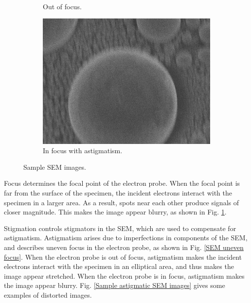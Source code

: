 \documentclass[conference]{IEEEtran}
\begin{document}
\begin{figure}[htbp]
\begin{subfigure}{0.4\textwidth}
        \caption{Out of focus.}
        \label{A out of focus}
    \end{subfigure}
    \begin{subfigure}{0.4\textwidth}
        \centering
        \includegraphics[width=1\textwidth]{Images/A astigmatism.jpg}
        \caption{In focus with astigmatism.}
        \label{A astigmatism}
    \end{subfigure}
    \caption{Sample SEM images.}
    \label{Sample SEM images}
\end{figure}

Focus determines the focal point of the electron probe. When the focal point is far from the surface of the specimen, the incident electrons interact with the specimen in a larger area. As a result, spots near each other produce signals of closer magnitude. This makes the image appear blurry, as shown in Fig. \ref{A out of focus}.

Stigmation controls stigmators in the SEM, which are used to compensate for astigmatism. Astigmatism arises due to imperfections in components of the SEM, and describes uneven focus in the electron probe, as shown in Fig. \ref{SEM uneven focus}. When the electron probe is out of focus, astigmatism makes the incident electrons interact with the specimen in an elliptical area, and thus makes the image appear stretched. When the electron probe is in focus, astigmatism makes the image appear blurry. Fig. \ref{Sample astigmatic SEM images} gives some examples of distorted images.
\end{document}
